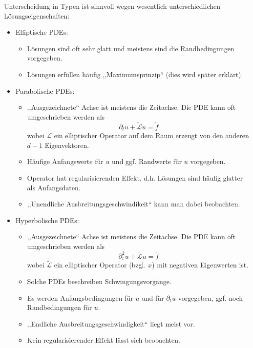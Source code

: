 \documentclass{book}
\newcommand{\tmtextbf}[1]{\text{{\bfseries{#1}}}}
\newenvironment{itemizedot}{\begin{itemize} \renewcommand{\labelitemi}{$\bullet$}\renewcommand{\labelitemii}{$\bullet$}\renewcommand{\labelitemiii}{$\bullet$}\renewcommand{\labelitemiv}{$\bullet$}}{\end{itemize}}
\newenvironment{itemizeminus}{\begin{itemize} \renewcommand{\labelitemi}{$-$}\renewcommand{\labelitemii}{$-$}\renewcommand{\labelitemiii}{$-$}\renewcommand{\labelitemiv}{$-$}}{\end{itemize}}
\begin{document}
\begin{remark*}
  \tmtextbf{(Charakterisierung)}
  
  Unterscheidung in Typen ist sinnvoll wegen wesentlich unterschiedlichen
  L{\"o}sungseigenschaften:
  \begin{itemizedot}
    \item Elliptische PDEs:
    \begin{itemizeminus}
      \item L{\"o}sungen sind oft sehr glatt und meistens sind die
      Randbedingungen vorgegeben.
      
      \item L{\"o}sungen erf{\"u}llen h{\"a}ufig ,,Maximumsprinzip`` (dies
      wird sp{\"a}ter erkl{\"a}rt).
    \end{itemizeminus}
    \item Parabolische PDEs:
    \begin{itemizeminus}
      \item ,,Ausgezeichnete`` Achse ist meistens die Zeitachse. Die PDE kann
      oft umgeschrieben werden als
      \[ \partial_t u + \widetilde{\mathcal{\mathscr{L}}} u = \tilde{f} \]
      wobei $\widetilde{\mathcal{\mathscr{L}}}$ ein elliptischer Operator auf
      dem Raum erzeugt von den anderen $d - 1$ Eigenvektoren.
      
      \item H{\"a}ufige Anfangswerte f{\"u}r $u$ und ggf. Randwerte f{\"u}r
      $u$ vorgegeben.
      
      \item Operator hat regularisierenden Effekt, d.h. L{\"o}sungen sind
      h{\"a}ufig glatter als Anfangsdaten.
      
      \item ,,Unendliche Ausbreitungsgeschwindikeit`` kann man dabei
      beobachten.
    \end{itemizeminus}
    \item Hyperbolische PDEs:
    \begin{itemizeminus}
      \item ,,Ausgezeichnete`` Achse ist meistens die Zeitachse. Die PDE kann
      oft umgeschrieben werden als
      \[ \partial^2_t u + \widetilde{\mathcal{\mathscr{L}}} u = \tilde{f} \]
      wobei $\widetilde{\mathcal{\mathscr{L}}}$ ein elliptischer Operator
      (bzgl. $x$) mit negativen Eigenwerten ist.
      
      \item Solche PDEs beschreiben Schwingungsvorg{\"a}nge.
      
      \item Es werden Anfangsbedingungen f{\"u}r $u$ und f{\"u}r $\partial_t
      u$ vorgegeben, ggf. noch Randbedingungen f{\"u}r $u$.
      
      \item ,,Endliche Ausbreitungsgeschwindigkeit`` liegt meist vor.
      
      \item Kein regularisierender Effekt l{\"a}sst sich beobachten. \ 
    \end{itemizeminus}
  \end{itemizedot}
\end{remark*}
\end{document}
